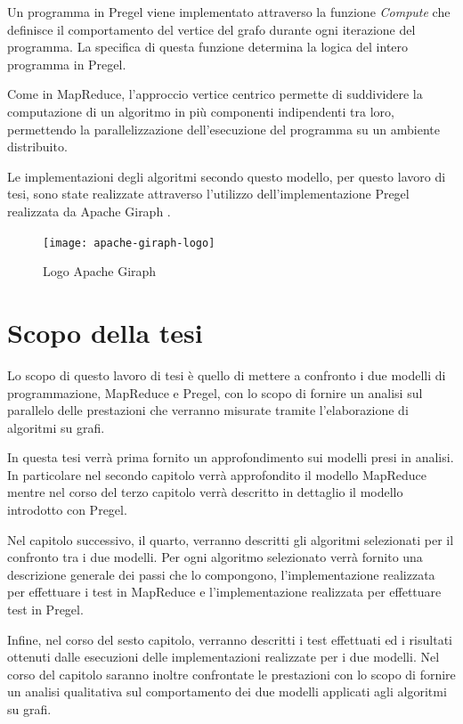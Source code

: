 \documentclass[LaM,binding=0.6cm]{sapthesis}
\begin{document}
Un programma in Pregel viene implementato attraverso la funzione \textit{Compute} che definisce il comportamento del vertice del grafo durante ogni iterazione del programma. La specifica di questa funzione determina la logica del intero programma in Pregel.

Come in MapReduce, l'approccio vertice centrico permette di suddividere la computazione di un algoritmo in più componenti indipendenti tra loro, permettendo la parallelizzazione dell'esecuzione del programma su un ambiente distribuito.

Le implementazioni degli algoritmi secondo questo modello, per questo lavoro di tesi, sono state realizzate attraverso l'utilizzo dell'implementazione Pregel realizzata da Apache Giraph \cite{4_giraph.apache.org_2015}.


\begin{figure}[h]
\centering
\texttt{[image: apache-giraph-logo]}
\caption{Logo Apache Giraph}
\label{fig:GiraphLogo}
\end{figure}

\section{Scopo della tesi}
Lo scopo di questo lavoro di tesi è quello di mettere a confronto i due modelli di programmazione, MapReduce e Pregel, con lo scopo di fornire un analisi sul parallelo delle prestazioni che verranno misurate tramite l'elaborazione di algoritmi su grafi.


In questa tesi verrà prima fornito un approfondimento sui modelli presi in analisi. In particolare nel secondo capitolo verrà approfondito il modello MapReduce mentre nel corso del terzo capitolo verrà descritto in dettaglio il modello introdotto con Pregel.

Nel capitolo successivo, il quarto, verranno descritti gli algoritmi selezionati per il confronto tra i due modelli. Per ogni algoritmo selezionato verrà fornito una descrizione generale dei passi che lo compongono, l'implementazione realizzata per effettuare i test in MapReduce e l'implementazione realizzata per effettuare test in Pregel.

Infine, nel corso del sesto capitolo, verranno descritti i test  effettuati ed i risultati ottenuti dalle esecuzioni delle implementazioni realizzate per i due modelli. 
Nel corso del capitolo saranno inoltre confrontate le prestazioni con lo scopo di fornire un analisi qualitativa sul comportamento dei due modelli applicati agli algoritmi su grafi.
\end{document}
